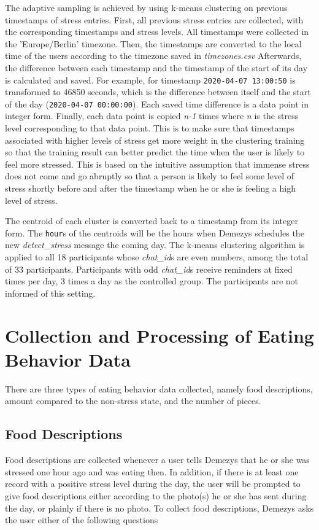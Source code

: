 The adaptive sampling is achieved by using k-means clustering on previous timestamps of stress entries. First, all previous stress entries are collected, with the corresponding timestamps and stress levels. All timestamps were collected in the 'Europe/Berlin' timezone. Then, the timestamps are converted to the local time of the users according to the timezone saved in \emph{timezones.csv} Afterwards, the difference between each timestamp and the timestamp of the start of its day is calculated and saved. For example, for timestamp \texttt{2020-04-07 13:00:50} is transformed to 46850 seconds, which is the difference between itself and the start of the day (\texttt{2020-04-07 00:00:00}). Each saved time difference is a data point in integer form. Finally, each data point is copied \emph{n-1} times where \emph{n} is the stress level corresponding to that data point. This is to make sure that timestamps associated with higher levels of stress get more weight in the clustering training so that the training result can better predict the time when the user is likely to feel more stressed. This is based on the intuitive assumption that immense stress does not come and go abruptly so that a person is likely to feel some level of stress shortly before and after the timestamp when he or she is feeling a high level of stress.

The centroid of each cluster is converted back to a timestamp from its integer form. The \texttt{hour}s of the centroids will be the hours when Demezys schedules the new \emph{detect\_stress} message the coming day. The k-means clustering algorithm is applied to all 18 participants whose \emph{chat\_id}s are even numbers, among the total of 33 participants. Participants with odd \emph{chat\_id}s receive reminders at fixed times per day, 3 times a day as the controlled group. The participants are not informed of this setting.

\section{Collection and Processing of Eating Behavior Data}
There are three types of eating behavior data collected, namely food descriptions, amount compared to the non-stress state, and the number of pieces.

\subsection{Food Descriptions}
Food descriptions are collected whenever a user tells Demezys that he or she was stressed one hour ago and was eating then. In addition, if there is at least one record with a positive stress level during the day, the user will be prompted to give food descriptions either according to the photo(s) he or she has sent during the day, or plainly if there is no photo. To collect food descriptions, Demezys asks the user either of the following questions

